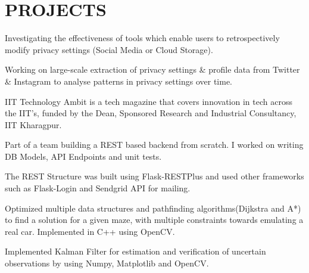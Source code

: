 \documentclass[]{deedy-resume-openfont}
\begin{document}
\begin{minipage}[t]{0.66\textwidth} 



\section{PROJECTS}

\vspace{\topsep} %
\begin{tightemize}
\item Investigating the effectiveness of tools which enable users to retrospectively modify privacy settings (Social Media or Cloud Storage).
\item Working on large-scale extraction of privacy settings \& profile data from Twitter \& Instagram to analyse patterns in privacy settings over time. 
\end{tightemize}

\sectionsep


\begin{tightemize}
\item IIT Technology Ambit is a tech magazine that covers innovation in tech across the IIT's, funded by the Dean, Sponsored Research and Industrial Consultancy, IIT Kharagpur.  
\item Part of a team building a REST based backend from scratch. I worked on writing DB Models, API Endpoints and unit tests.
\item The REST Structure was built using Flask-RESTPlus and used other frameworks such as Flask-Login and Sendgrid API for mailing.
\end{tightemize}
\sectionsep

\begin{tightemize}
\item Optimized multiple data structures and pathfinding algorithms(Dijkstra and A*) to find a solution for a given maze, with multiple constraints towards emulating a real car. Implemented in C++ using OpenCV.
\item Implemented Kalman Filter for estimation and verification of uncertain observations by using Numpy, Matplotlib and OpenCV.


\end{tightemize}
\end{minipage}
\end{document}
